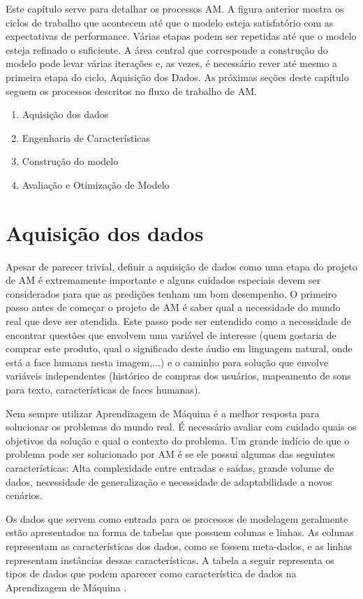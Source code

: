 Este capítulo serve para detalhar os processos AM. A figura anterior mostra os ciclos de trabalho que acontecem até que o modelo esteja satisfatório com as expectativas de performance. Várias etapas podem ser repetidas até que o modelo esteja refinado o suficiente. A área central que corresponde a construção do modelo pode levar várias iterações e, as vezes, é necessário rever até mesmo a primeira etapa do ciclo, Aquisição dos Dados. As próximas seções deste capítulo seguem os processos descritos no fluxo de trabalho de AM.

\begin{enumerate}
\item Aquisição dos dados
\item Engenharia de Características
\item Construção do modelo
\item Avaliação e Otimização de Modelo
\end{enumerate}

\section{Aquisição dos dados}
Apesar de parecer trivial, definir a aquisição de dados como uma etapa do projeto de AM é extremamente importante e alguns cuidados especiais devem ser considerados para que as predições tenham um bom desempenho. O primeiro passo antes de começar o projeto de AM é saber qual a necessidade do mundo real que deve ser atendida. Este passo pode ser entendido como a necessidade de encontrar questões que envolvem uma variável de interesse (quem gostaria de comprar este produto, qual o significado deste áudio em linguagem natural, onde está a face humana nesta imagem,...) e o caminho para solução que envolve variáveis independentes (histórico de compras dos usuários, mapeamento de sons para texto, características de faces humanas).

Nem sempre utilizar Aprendizagem de Máquina é a melhor resposta para solucionar os problemas do mundo real. É necessário avaliar com cuidado quais os objetivos da solução e qual o contexto do problema. Um grande indício de que o problema pode ser solucionado por AM é se ele possui algumas das seguintes características: Alta complexidade entre entradas e saídas, grande volume de dados, necessidade de generalização e necessidade de adaptabilidade a novos cenários. 

Os dados que servem como entrada para os processos de modelagem geralmente estão apresentados na forma de tabelas que possuem colunas e linhas. As colunas representam as características dos dados, como se fossem meta-dados, e as linhas representam instâncias dessas características. A tabela a seguir representa os tipos de dados que podem aparecer como característica de dados na Aprendizagem de Máquina \cite{guy2010}.

